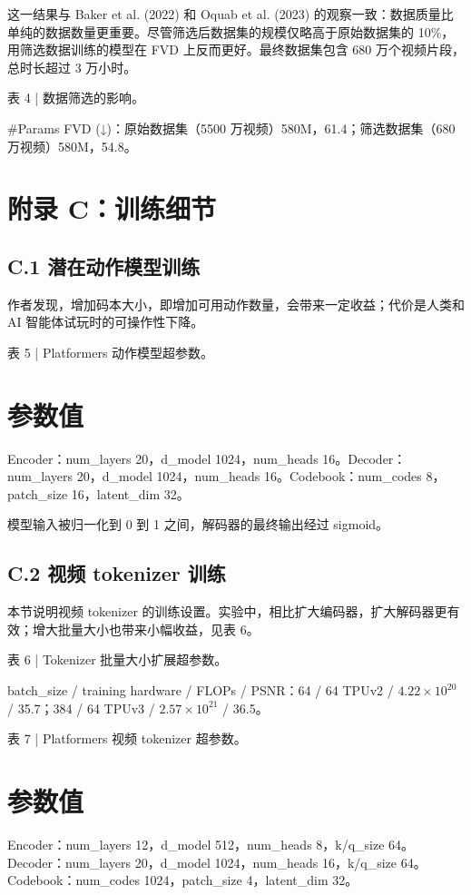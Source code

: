 \documentclass[10pt]{article}
\begin{document}
这一结果与 Baker et al. (2022) 和 Oquab et al. (2023) 的观察一致：数据质量比单纯的数据数量更重要。尽管筛选后数据集的规模仅略高于原始数据集的 10\%，用筛选数据训练的模型在 FVD 上反而更好。最终数据集包含 680 万个视频片段，总时长超过 3 万小时。

表 4 | 数据筛选的影响。

\#Params FVD (↓)：原始数据集（5500 万视频）580M，61.4；筛选数据集（680 万视频）580M，54.8。

\section*{附录 C：训练细节}
\subsection*{C.1 潜在动作模型训练}

作者发现，增加码本大小，即增加可用动作数量，会带来一定收益；代价是人类和 AI 智能体试玩时的可操作性下降。

表 5 | Platformers 动作模型超参数。

\section*{参数值}
Encoder：num\_layers 20，d\_model 1024，num\_heads 16。Decoder：num\_layers 20，d\_model 1024，num\_heads 16。Codebook：num\_codes 8，patch\_size 16，latent\_dim 32。

模型输入被归一化到 0 到 1 之间，解码器的最终输出经过 sigmoid。

\subsection*{C.2 视频 tokenizer 训练}

本节说明视频 tokenizer 的训练设置。实验中，相比扩大编码器，扩大解码器更有效；增大批量大小也带来小幅收益，见表 6。

表 6 | Tokenizer 批量大小扩展超参数。

batch\_size / training hardware / FLOPs / PSNR：64 / 64 TPUv2 / $4.22 \times 10^{20}$ / 35.7；384 / 64 TPUv3 / $2.57 \times 10^{21}$ / 36.5。

表 7 | Platformers 视频 tokenizer 超参数。

\section*{参数值}
Encoder：num\_layers 12，d\_model 512，num\_heads 8，k/q\_size 64。Decoder：num\_layers 20，d\_model 1024，num\_heads 16，k/q\_size 64。Codebook：num\_codes 1024，patch\_size 4，latent\_dim 32。
\end{document}
